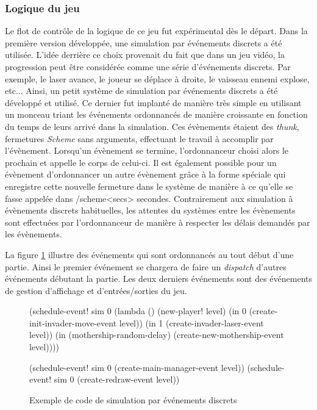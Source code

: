 \documentclass[12pt,twoside,letterpaper,francais]{book}
\newcommand{\Schemelang}{{\textit{Scheme }}}
\newcommand{\scheme}[1]{\selectlanguage{english}{\tt #1}\selectlanguage{french}}
\begin{document}
\FloatBarrier
\subsubsection{Logique du jeu}
Le flot de contrôle de la logique de ce jeu fut expérimental dès le
départ. Dans la première version développée, une simulation par
événements discrets a été utilisée. L'idée derrière ce choix provenait
du fait que dans un jeu vidéo, la progression peut être considérée
comme une série d'événements discrets. Par exemple, le laser avance,
le joueur se déplace à droite, le vaisseau ennemi explose,
etc... Ainsi, un petit système de simulation par événements discrets a
été développé et utilisé. Ce dernier fut implanté de manière très
simple en utilisant un monceau triant les événements ordonnancés de
manière croissante en fonction du temps de leurs arrivé dans la
simulation. Ces évènements étaient des \textit{thunk}, fermetures
\Schemelang sans arguments, effectuant le travail à accomplir par
l'évènement. Lorsqu'un évènement se termine, l'ordonnanceur choisi
alors le prochain et appelle le corps de celui-ci. Il est également
possible pour un évènement d'ordonnancer un autre évènement grâce à la
forme spéciale \scheme{(in <secs> <thunk>)} qui enregistre cette
nouvelle fermeture dans le système de manière à ce qu'elle se fasse
appelée dans /scheme{<secs>} secondes. Contrairement aux simulation à
évènements discrets habituelles, les attentes du systèmes entre les
évènements sont effectuées par l'ordonnanceur de manière à respecter
les délais demandés par les évènements.

La figure \ref{Exp:des} illustre des événements qui sont ordonnancés
au tout début d'une partie. Ainsi le premier événement se chargera de
faire un \textit{dispatch} d'autres événements débutant la partie. Les
deux derniers événements sont des événements de gestion d'affichage et
d'entrées/sorties du jeu.

\begin{figure}[htb!]
  \begin{schemecode}
(schedule-event! sim 0
  (lambda () (new-player! level)
             (in 0 (create-init-invader-move-event level))
             (in 1 (create-invader-laser-event level))
             (in (mothership-random-delay)
                 (create-new-mothership-event level))))
 
(schedule-event! sim 0 (create-main-manager-event level))
(schedule-event! sim 0 (create-redraw-event level))
  \end{schemecode}
  \caption{Exemple de code de simulation par événements discrets}
  \label{Exp:des}
\end{figure}
\end{document}
